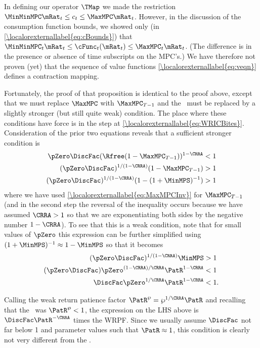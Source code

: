 \documentclass[\econtexRoot/BufferStockTheory.tex]{subfiles}
\begin{document}
In defining our operator $\TMap$ we made the restriction
$\MinMinMPC \mRat_{t} \leq c_{t} \leq \MaxMPC \mRat_{t}$.  However,
in the discussion of the consumption function bounds, we
showed only (in \eqref{\localorexternallabel{eq:cBounds}}) that $\MinMinMPC_{t} \mRat_{t} \leq \cFunc_{t}(\mRat_{t})
\leq \MaxMPC_{t} \mRat_{t}$.  (The difference is in the presence
or absence of time subscripts on the MPC's.)
  We have therefore
not proven (yet) that the sequence of value functions \eqref{\localorexternallabel{eq:veqn}} defines a contraction mapping.

Fortunately, the proof of that proposition is identical to the proof above, except that we must replace
$\MaxMPC$ with $\MaxMPC_{T-1}$ and the \WRIC~must be
replaced by a slightly stronger (but still quite weak) condition.  The place where these
conditions have force is in the step at \eqref{\localorexternallabel{eq:WRICBites}}.
Consideration of the prior two equations reveals that
a sufficient stronger condition is
\begin{align*}
    \pZero \DiscFac (\Rfree (1-\MaxMPC_{T-1}))^{1-\CRRA}  & < 1
\\  (\pZero \DiscFac)^{1/(1-\CRRA)}  (1-\MaxMPC_{T-1})  & > 1
\\  (\pZero \DiscFac)^{1/(1-\CRRA)}  (1-(1+\MinMPS)^{-1})  & > 1
\end{align*}
where we have used \eqref{\localorexternallabel{eq:MaxMPCInv}} for $\MaxMPC_{T-1}$ (and in the second step the reversal of the inequality occurs because we have assumed $\CRRA > 1$ so that we are exponentiating both sides by the negative number $1-\CRRA$).  To see that this is a weak condition, note that for small values of
$\pZero$ this expression can be further simplified using $(1+\MinMPS)^{-1}
\approx 1-\MinMPS$ so that it becomes
\begin{align*}
  (\pZero \DiscFac)^{1/(1-\CRRA)}  \MinMPS  & > 1
\\  (\pZero \DiscFac)  \pZero^{(1-\CRRA)/\CRRA} \PatR^{1-\CRRA}  & < 1
\\  \DiscFac  \pZero^{1/\CRRA} \PatR^{1-\CRRA}  & < 1.
\end{align*}

Calling the weak return patience factor $\PatR^{\wp}=\wp^{1/\CRRA}\PatR$ and
recalling that the \WRIC~was $\PatR^{\wp}<1$, the expression on the LHS
above is $\DiscFac \PatR^{-\CRRA}$ times the WRPF.  Since we usually assume $\DiscFac$ not far below 1 and
parameter values such that $\PatR \approx 1$, this condition is clearly not very
different from the \WRIC.
\end{document}
